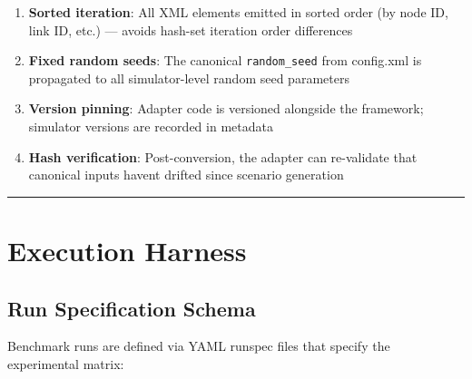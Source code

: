 \begin{enumerate}
\def\labelenumi{\arabic{enumi}.}
\tightlist
\item
  \textbf{Sorted iteration}: All XML elements emitted in sorted order
  (by node ID, link ID, etc.) --- avoids hash-set iteration order
  differences
\item
  \textbf{Fixed random seeds}: The canonical \texttt{random\_seed} from
  config.xml is propagated to all simulator-level random seed parameters
\item
  \textbf{Version pinning}: Adapter code is versioned alongside the
  framework; simulator versions are recorded in metadata
\item
  \textbf{Hash verification}: Post-conversion, the adapter can
  re-validate that canonical inputs haven\textquotesingle t drifted
  since scenario generation
\end{enumerate}

\begin{center}\rule{0.5\linewidth}{0.5pt}\end{center}

\section{Execution Harness}\label{35-execution-harness}

\subsection{Run Specification
Schema}\label{351-run-specification-schema}

Benchmark runs are defined via YAML runspec files that specify the
experimental matrix:


